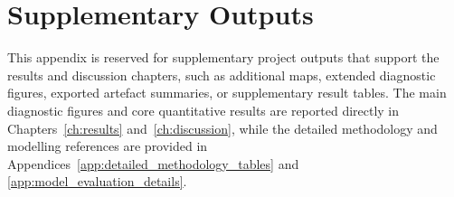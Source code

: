 \chapter{Supplementary Outputs}
\label{app:supplementary_outputs}

This appendix is reserved for supplementary project outputs that support
the results and discussion chapters, such as additional maps, extended
diagnostic figures, exported artefact summaries, or supplementary result
tables. The main diagnostic figures and core quantitative results are
reported directly in Chapters~\ref{ch:results} and~\ref{ch:discussion},
while the detailed methodology and modelling references are provided in
Appendices~\ref{app:detailed_methodology_tables} and
\ref{app:model_evaluation_details}.
